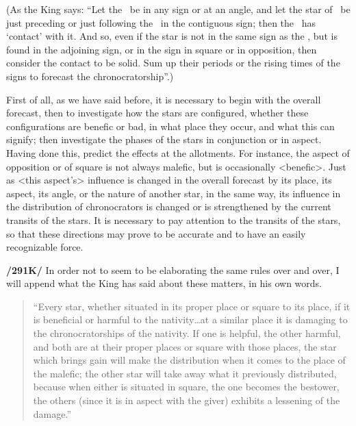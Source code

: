 (As \mndl the King says: “Let the \Moon\, be in any sign or at an angle, and let the star of \Mars\, be just preceding or just following the \Moon\, in the contiguous sign; then the \Moon\, has ‘contact’ with it. And so, even if the star is not in the same sign as the \Moon, but is found in the adjoining sign, or in the sign in square or in opposition, then consider the contact to be solid. Sum up their periods or the rising times of the signs to forecast the chronocratorship”.)

First of \mnm all, as we have said before, it is necessary to begin with the overall forecast, then to investigate how the stars are configured, whether these configurations are benefic or bad, in what place they occur, and what this can signify; then investigate the phases of the stars in conjunction or in aspect. Having done this, predict the effects at the allotments. For \mndl instance, the aspect of opposition or of square is not always malefic, but is occasionally <benefic>. Just as <this aspect’s> influence is changed in the overall forecast by its place, its aspect, its angle, or the nature of another star, in the same way, its influence in the distribution of chronocrators is changed or is strengthened by the current transits of the stars. It is necessary to pay attention to the transits of the stars, so that these directions may prove to be accurate and to have an easily recognizable force.

\textbf{/291K/} In order not to seem to be elaborating the same rules over and over, I will append what the King has said about these matters, in his own words.
\begin{quote}
“Every star, whether situated in its proper place or square to its place, if it is beneficial or harmful to the nativity…at a similar place it is damaging to the chronocratorships of the nativity. If one is helpful, the other harmful, and both are at their proper places or square with those places, the star which brings gain will make the distribution when it comes to the place of the malefic; the other star will take away what it previously distributed, because when either is situated in square, the one becomes the bestower, the others (since it is in aspect with the giver) exhibits a lessening of the damage.”
\end{quote}

